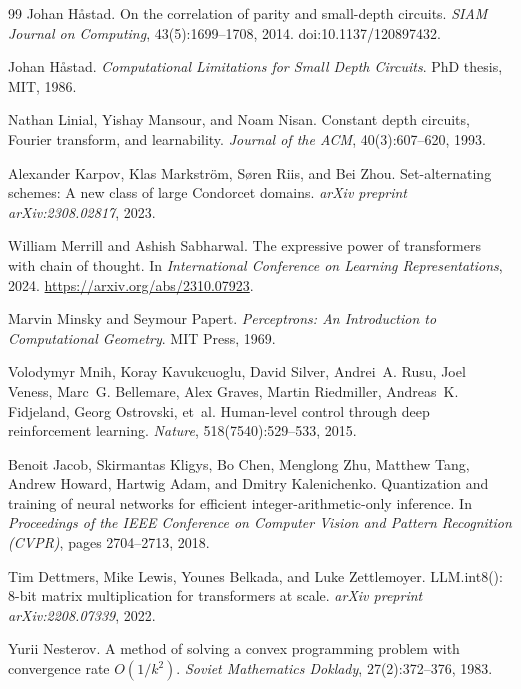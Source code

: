 \documentclass[11pt]{article}
\theoremstyle{plain}
\theoremstyle{definition}
\theoremstyle{remark}
\numberwithin{equation}{section}
\begin{document}
\begin{thebibliography}{99}
Johan H{\aa}stad.
\newblock On the correlation of parity and small-depth circuits.
\newblock \emph{SIAM Journal on Computing}, 43(5):1699--1708, 2014.
\newblock doi:10.1137/120897432.

Johan H{\aa}stad.
\newblock \emph{Computational Limitations for Small Depth Circuits}.
\newblock PhD thesis, MIT, 1986.

Nathan Linial, Yishay Mansour, and Noam Nisan.
\newblock Constant depth circuits, Fourier transform, and learnability.
\newblock \emph{Journal of the ACM}, 40(3):607--620, 1993.

Alexander Karpov, Klas Markstr{\"o}m, S{\o}ren Riis, and Bei Zhou.
\newblock Set-alternating schemes: A new class of large Condorcet domains.
\newblock \emph{arXiv preprint arXiv:2308.02817}, 2023.

William Merrill and Ashish Sabharwal.
\newblock The expressive power of transformers with chain of thought.
\newblock In \emph{International Conference on Learning Representations}, 2024.
\newblock \url{https://arxiv.org/abs/2310.07923}.

Marvin Minsky and Seymour Papert.
\newblock \emph{Perceptrons: An Introduction to Computational Geometry}.
\newblock MIT Press, 1969.

Volodymyr Mnih, Koray Kavukcuoglu, David Silver, Andrei~A. Rusu, Joel Veness,
Marc~G. Bellemare, Alex Graves, Martin Riedmiller, Andreas~K. Fidjeland,
Georg Ostrovski, et~al.
\newblock Human-level control through deep reinforcement learning.
\newblock \emph{Nature}, 518(7540):529--533, 2015.

Benoit Jacob, Skirmantas Kligys, Bo Chen, Menglong Zhu, Matthew Tang, Andrew Howard, Hartwig Adam, and Dmitry Kalenichenko.
\newblock Quantization and training of neural networks for efficient integer-arithmetic-only inference.
\newblock In \emph{Proceedings of the IEEE Conference on Computer Vision and Pattern Recognition (CVPR)}, pages 2704--2713, 2018.

Tim Dettmers, Mike Lewis, Younes Belkada, and Luke Zettlemoyer.
\newblock LLM.int8(): 8-bit matrix multiplication for transformers at scale.
\newblock \emph{arXiv preprint arXiv:2208.07339}, 2022.

Yurii Nesterov.
\newblock A method of solving a convex programming problem with convergence rate $O(1/k^2)$.
\newblock \emph{Soviet Mathematics Doklady}, 27(2):372--376, 1983.


\end{thebibliography}
\end{document}
